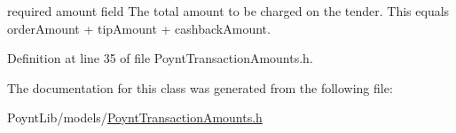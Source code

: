required amount field  The total amount to be charged on the tender. This equals order\+Amount + tip\+Amount + cashback\+Amount. 



Definition at line 35 of file Poynt\+Transaction\+Amounts.\+h.



The documentation for this class was generated from the following file\+:\begin{DoxyCompactItemize}
\item 
Poynt\+Lib/models/\hyperlink{_poynt_transaction_amounts_8h}{Poynt\+Transaction\+Amounts.\+h}\end{DoxyCompactItemize}
